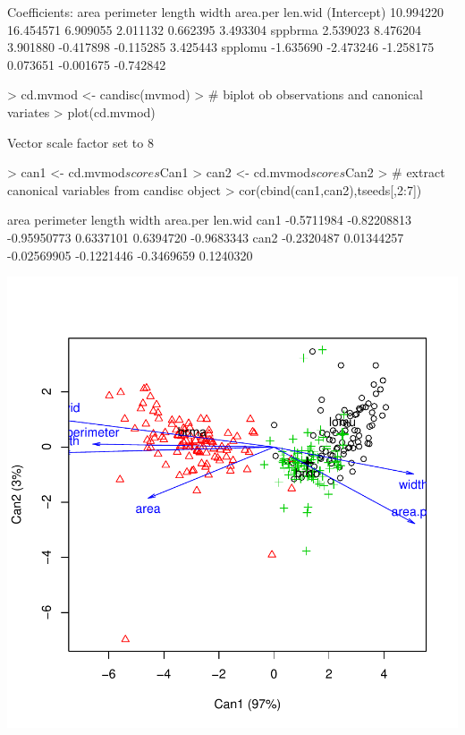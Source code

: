 \documentclass{article}
\begin{document}
\begin{Schunk}
\begin{Soutput}
Coefficients:
             area       perimeter  length     width      area.per   len.wid  
(Intercept)  10.994220  16.454571   6.909055   2.011132   0.662395   3.493304
sppbrma       2.539023   8.476204   3.901880  -0.417898  -0.115285   3.425443
spplomu      -1.635690  -2.473246  -1.258175   0.073651  -0.001675  -0.742842
\end{Soutput}
\begin{Sinput}
> cd.mvmod <- candisc(mvmod)
> # biplot ob observations and canonical variates
> plot(cd.mvmod)
\end{Sinput}
\begin{Soutput}
Vector scale factor set to  8 
\end{Soutput}
\begin{Sinput}
> can1 <- cd.mvmod$scores$Can1
> can2 <- cd.mvmod$scores$Can2
> # extract canonical variables from candisc object
> cor(cbind(can1,can2),tseeds[,2:7])
\end{Sinput}
\begin{Soutput}
           area   perimeter      length      width   area.per    len.wid
can1 -0.5711984 -0.82208813 -0.95950773  0.6337101  0.6394720 -0.9683343
can2 -0.2320487  0.01344257 -0.02569905 -0.1221446 -0.3469659  0.1240320
\end{Soutput}
\end{Schunk}
\includegraphics{HW09MANOVA_DA-004}
\end{document}
